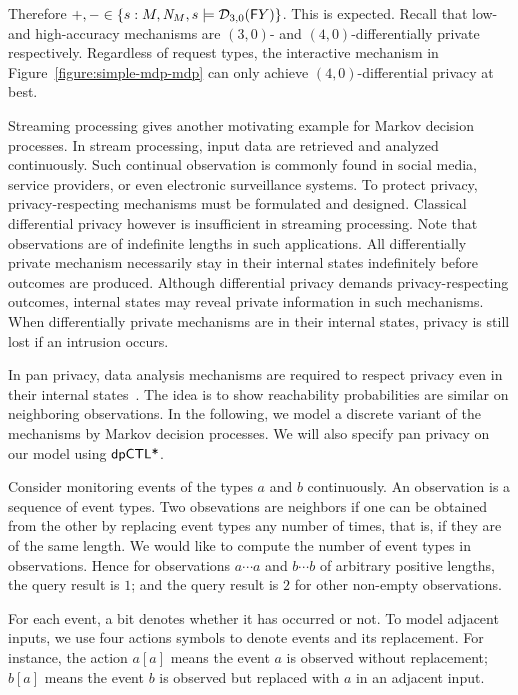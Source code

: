 Therefore $+, - \in \{ s : M, \mathit{N}_{M}, s \models \mathcal{D}_{{3}, {0}}
(\mathsf{F} Y) \}$. This is expected. Recall that low- and high-accuracy
mechanisms are $(3, 0)$- and $(4, 0)$-differentially private
respectively. Regardless of request types, the interactive mechanism
in Figure~\ref{figure:simple-mdp-mdp} can only achieve $(4,
0)$-differential privacy at best.


Streaming processing gives another motivating example for Markov
decision processes. In stream processing, input data are retrieved and
analyzed continuously. Such continual observation is commonly found
in social media, service providers, or even electronic surveillance
systems. To protect privacy, privacy-respecting mechanisms must be
formulated and designed. Classical differential privacy however is
insufficient in streaming processing. Note that observations are of
indefinite lengths in such applications. All differentially private
mechanism necessarily stay in their internal states indefinitely
before outcomes are produced. Although differential privacy demands
privacy-respecting outcomes, internal states may reveal private
information in such mechanisms. When differentially private mechanisms
are in their internal states, privacy is still lost if an intrusion
occurs.

In pan privacy, data analysis mechanisms are required to respect
privacy even in their internal states~\cite{DNPR:10:DPCO,DNPRY:10:PPSA}. 
The idea is to show reachability probabilities are similar on
neighboring observations. In the following, we model a discrete
variant of the mechanisms by Markov decision processes. We will also
specify pan privacy on our model using $\textsf{dpCTL*}$.

Consider monitoring events of the types $a$ and $b$ continuously. An
observation is a sequence of event types. Two obsevations are
{neighbors} if one can be obtained from the other by replacing 
event types any number of times, that is, if they are of the same
length.  
We would like to compute the number of event types in
observations. Hence for observations $a \cdots a$ and $b \cdots b$ of
arbitrary positive lengths, the query result is $1$; and the query
result is $2$ for other non-empty observations. 

For each event, a bit denotes whether it has occurred or not. To model
adjacent inputs, we use four actions symbols to denote events and its
replacement. For instance, the action $a[a]$ means the event $a$ is
observed without replacement; $b[a]$ means the event $b$ is observed
but replaced with $a$ in an adjacent input. 

